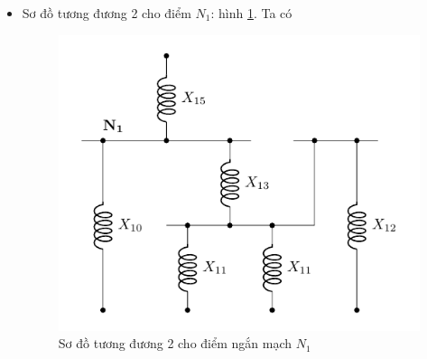 \documentclass[12pt,a4paper]{article}
\begin{document}
\begin{itemize}
\begin{itemize}
\begin{itemize}
				
				\newpage
				\item Sơ đồ tương đương 2 cho điểm $N_1$: hình \ref{Fig:sodo-tuongduong-bt1-N1-2}. Ta có
					\begin{figure}[!h]
						\begin{center}
							\includegraphics[scale=1]{figure-baitap-nganmach-1-N1-2.pdf} 
						\end{center}
					\caption{Sơ đồ tương đương 2 cho điểm ngắn mạch $N_1$} \label{Fig:sodo-tuongduong-bt1-N1-2}
					\end{figure}

\end{itemize}
\end{itemize}
\end{itemize}
\end{document}
